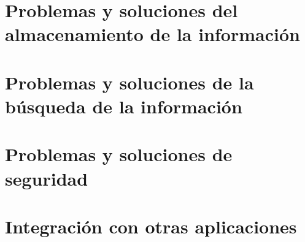 \section{Problemas y soluciones del almacenamiento de la información}
\label{sec:almacenamiento}


\section{Problemas y soluciones de la búsqueda de la información}
\label{sec:busqueda}


\section{Problemas y soluciones de seguridad}
\label{sec:seguridad}


\section{Integración con otras aplicaciones}
\label{sec:conectividad}

